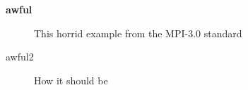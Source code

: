 \documentclass{article}
\begin{document}
\begin{description}
\item[{\bf awful}]This horrid example from the MPI-3.0 standard
\item[awful2]How it should be
\end{description}
\end{document}
